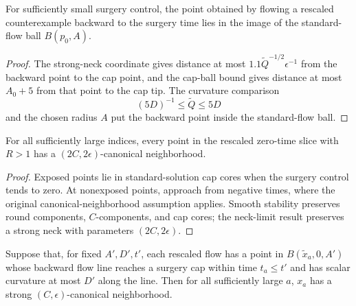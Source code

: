 \begin{claim}
\label{claim:w-ab-in-ball-image}
For sufficiently small surgery control, the point obtained by flowing a
rescaled counterexample backward to the surgery time lies in the image of the
standard-flow ball $B(p_0,A)$.
\end{claim}

\begin{proof}
\sketch
The strong-neck coordinate gives distance at most
$1.1\widetilde Q^{-1/2}\epsilon^{-1}$ from the backward point to the cap point,
and the cap-ball bound gives distance at most $A_0+5$ from that point to the
cap tip. The curvature comparison
\begin{equation}
\label{DQ}
  (5D)^{-1}\leq\widetilde Q\leq5D
\end{equation}
and the chosen radius $A$ put the backward point inside the standard-flow ball.
\end{proof}

\begin{claim}
\label{claim:limit-points-have-canonical-neighborhood}
For all sufficiently large indices, every point in the rescaled zero-time slice
with $R>1$ has a $(2C,2\epsilon)$-canonical neighborhood.
\end{claim}

\begin{proof}
\sketch
{}
Exposed points lie in standard-solution cap cores when the surgery control tends
to zero. At nonexposed points, approach from negative times, where the original
canonical-neighborhood assumption applies. Smooth stability preserves round
components, $C$-components, and cap cores; the neck-limit result preserves a
strong neck with parameters $(2C,2\epsilon)$.
\end{proof}

\begin{lemma}
\label{lem:std-cap-canonical-neighborhood}
\label{lemstdcan}
Suppose that, for fixed $A',D',t'$, each rescaled flow has a point in
$B(\widetilde x_a,0,A')$ whose backward flow line reaches a surgery cap within
time $t_a\leq t'$ and has scalar curvature at most $D'$ along the line. Then
for all sufficiently large $a$, $x_a$ has a strong $(C,\epsilon)$-canonical
neighborhood.
\end{lemma}


